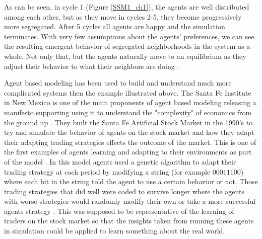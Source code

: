 \documentclass[12pt,twoside]{reedthesis}
\begin{document}
As can be seen, in cycle 1 (Figure \ref{SSM1_ch1}), the agents are well distributed among each other, but as they move in cycles 2-5, they become progressively more segregated. After 5 cycles all agents are happy and the simulation terminates. With very few assumptions about the agents' preferences, we can see the resulting emergent behavior of segregated neighborhoods in the system as a whole. Not only that, but the agents naturally move to an equilibrium as they adjust their behavior to what their neighbors are doing \citep{Sargent2019}. 

Agent based modeling has been used to build and understand much more complicated systems then the example illustrated above. The Santa Fe Institute in New Mexico is one of the main proponents of agent based modeling releasing a manifesto supporting using it to understand the "complexity" of economics from the ground up \citep{Backhouse2016}. They built the Santa Fe Artificial Stock Market in the 1990's to try and simulate the behavior of agents on the stock market and how they adapt their adapting trading strategies effects the outcome of the market. This is one of the first examples of agents learning and adapting to their environments as part of the model \citep{LeBaron2002}. In this model agents used a genetic algorithm to adapt their trading strategy at each period by modifying a string (for example $00011100$) where each bit in the string told the agent to use a certain behavior or not. Those trading strategies that did well were coded to survive longer where the agents with worse strategies would randomly modify their own or take a more successful agents strategy \citep{Arthur1992}. This was supposed to be representative of the learning of traders on the stock market so that the insights taken from running these agents in simulation could be applied to learn something about the real world. 
\end{document}
